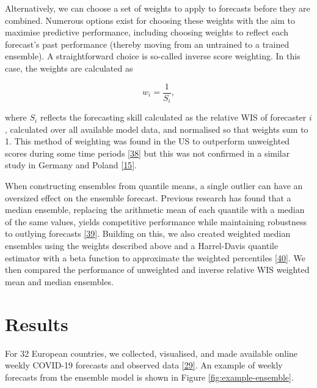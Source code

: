 \documentclass[
]{article}
\begin{document}
Alternatively, we can choose a set of weights to apply to forecasts before they are combined. Numerous options exist for choosing these weights with the aim to maximise predictive performance, including choosing weights to reflect each forecast's past performance (thereby moving from an untrained to a trained ensemble). A straightforward choice is so-called inverse score weighting. In this case, the weights are calculated as

\[w_i = \frac{1}{S_i},\]

where \(S_i\) reflects the forecasting skill calculated as the relative WIS of forecaster \(i\), calculated over all available model data, and normalised so that weights sum to 1. This method of weighting was found in the US to outperform unweighted scores during some time periods \protect\hyperlink{ref-taylorCombiningProbabilisticForecasts2021}{{[}38{]}} but this was not confirmed in a similar study in Germany and Poland \protect\hyperlink{ref-bracherPreregisteredShorttermForecasting2021}{{[}15{]}}.

When constructing ensembles from quantile means, a single outlier can have an oversized effect on the ensemble forecast. Previous research has found that a median ensemble, replacing the arithmetic mean of each quantile with a median of the same values, yields competitive performance while maintaining robustness to outlying forecasts \protect\hyperlink{ref-rayComparingTrainedUntrained2022}{{[}39{]}}. Building on this, we also created weighted median ensembles using the weights described above and a Harrel-Davis quantile estimator with a beta function to approximate the weighted percentiles \protect\hyperlink{ref-harrellNewDistributionfreeQuantile1982}{{[}40{]}}. We then compared the performance of unweighted and inverse relative WIS weighted mean and median ensembles.

\hypertarget{results}{%
\section{Results}\label{results}}

For 32 European countries, we collected, visualised, and made available online weekly COVID-19 forecasts and observed data \protect\hyperlink{ref-katharine_sherratt_2022_7356267}{{[}29{]}}. An example of weekly forecasts from the ensemble model is shown in Figure \ref{fig:example-ensemble}.
\end{document}
